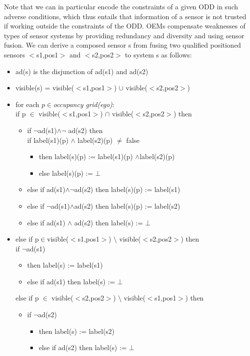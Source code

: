 Note that we can in particular encode the constraints of a given ODD in such adverse conditions, which thus entails that information of a sensor is not trusted if working outside the constraints of the ODD. OEMs compensate weaknesses of types of sensor systems by providing redundancy and diversity and using sensor fusion. We can derive a composed sensor s from fusing two qualified positioned sensors $<$s1,pos1$>$  and $<$s2,pos2$>$ to system s as follows:
\begin{itemize}
\item ad(s) is the disjunction of ad(s1) and ad(s2)
\item visible(s) = visible($<$s1,pos1$>$) $\cup$ visible($<$s2,pos2$>$)
\item for each $p\in $\textit{occupancy grid(ego)}:  \\
if p $\in$ visible($<$s1,pos1$>$) $\cap$ visible($<$s2,pos2$>$) then
\begin{itemize}
\item if $\neg$ad(s1)$\land\neg$ ad(s2) then\\
if label(s1)(p) $\land$ label(s2)(p) $\not=$ false 
\begin{itemize}
\item[] then label(s)(p) := label(s1)(p) $\land $label(s2)(p)
\item[] else label(s)(p) := $\bot$
\end{itemize}
\item[] else if ad(s1)$\land\neg$ad(s2) then label(s)(p) := label(s1)
\item[] else if $\neg$ad(s1)$\land$ad(s2) then label(s)(p) := label(s2)
\item[] else if ad(s1) $\land$ ad(s2) then label(s) := $\bot$
\end{itemize}
\item[] else if p$\in$visible($<$s1,pos1$>$) $\setminus$ visible($<$s2,pos2$>$) then\\	
if $\neg$ad(s1)
\begin{itemize}
    \item[] then label(s) := label(s1)
	\item[] else if ad(s1) then label(s) := $\bot$
	\end{itemize}
	else if p $\in$ visible($<$s2,pos2$>$) $\setminus$ visible($<$s1,pos1$>$) then
	\begin{itemize}
	\item[] if $\neg$ad(s2) 
	\begin{itemize}
	    \item[]then label(s) := label(s2)
	\item[] else if ad(s2) then label(s) := $\bot$
    \end{itemize}
    \end{itemize}
\end{itemize}
